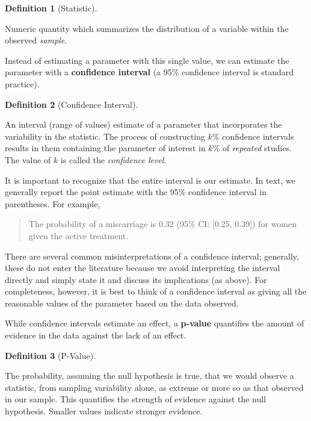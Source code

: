 \documentclass[
  letterpaper,
  DIV=11,
  numbers=noendperiod]{scrreprt}
\theoremstyle{definition}
\theoremstyle{definition}
\newtheorem{definition}{Definition}[chapter]
\theoremstyle{remark}
\begin{document}
\begin{definition}[Statistic]\protect\hypertarget{def-statistic}{}\label{def-statistic}

Numeric quantity which summarizes the distribution of a variable within
the observed \emph{sample}.

\end{definition}

Instead of estimating a parameter with this single value, we can
estimate the parameter with a \textbf{confidence interval} (a 95\%
confidence interval is standard practice).

\begin{definition}[Confidence
Interval]\protect\hypertarget{def-confidence-interval}{}\label{def-confidence-interval}

An interval (range of values) estimate of a parameter that incorporates
the variability in the statistic. The process of constructing \(k\)\%
confidence intervals results in them containing the parameter of
interest in \(k\)\% of \emph{repeated} studies. The value of \(k\) is
called the \emph{confidence level}.

\end{definition}

It is important to recognize that the entire interval is our estimate.
In text, we generally report the point estimate with the 95\% confidence
interval in parentheses. For example,

\begin{quote}
The probability of a miscarriage is 0.32 (95\% CI: {[}0.25, 0.39{]}) for
women given the active treatment.
\end{quote}

There are several common misinterpretations of a confidence interval;
generally, these do not enter the literature because we avoid
interpreting the interval directly and simply state it and discuss its
implications (as above). For completeness, however, it is best to think
of a confidence interval as giving all the reasonable values of the
parameter based on the data observed.

While confidence intervals estimate an effect, a \textbf{p-value}
quantifies the amount of evidence in the data against the lack of an
effect.

\begin{definition}[P-Value]\protect\hypertarget{def-pvalue}{}\label{def-pvalue}

The probability, assuming the null hypothesis is true, that we would
observe a statistic, from sampling variability alone, as extreme or more
so as that observed in our sample. This quantifies the strength of
evidence against the null hypothesis. Smaller values indicate stronger
evidence.

\end{definition}
\end{document}
